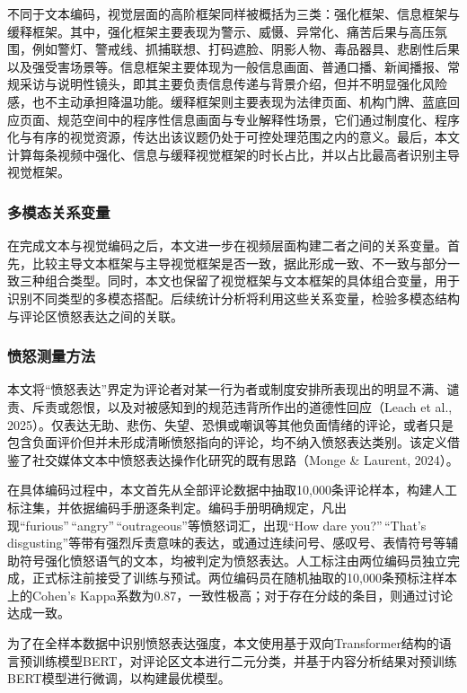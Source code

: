 \documentclass[
]{article}
\begin{document}
不同于文本编码，视觉层面的高阶框架同样被概括为三类：强化框架、信息框架与缓释框架。其中，强化框架主要表现为警示、威慑、异常化、痛苦后果与高压氛围，例如警灯、警戒线、抓捕联想、打码遮脸、阴影人物、毒品器具、悲剧性后果以及强受害场景等。信息框架主要体现为一般信息画面、普通口播、新闻播报、常规采访与说明性镜头，即其主要负责信息传递与背景介绍，但并不明显强化风险感，也不主动承担降温功能。缓释框架则主要表现为法律页面、机构门牌、蓝底回应页面、规范空间中的程序性信息画面与专业解释性场景，它们通过制度化、程序化与有序的视觉资源，传达出该议题仍处于可控处理范围之内的意义。最后，本文计算每条视频中强化、信息与缓释视觉框架的时长占比，并以占比最高者识别主导视觉框架。

\subsubsection{多模态关系变量}\label{ux591aux6a21ux6001ux5173ux7cfbux53d8ux91cf}

在完成文本与视觉编码之后，本文进一步在视频层面构建二者之间的关系变量。首先，比较主导文本框架与主导视觉框架是否一致，据此形成一致、不一致与部分一致三种组合类型。同时，本文也保留了视觉框架与文本框架的具体组合变量，用于识别不同类型的多模态搭配。后续统计分析将利用这些关系变量，检验多模态结构与评论区愤怒表达之间的关联。

\subsubsection{愤怒测量方法}\label{ux6124ux6012ux6d4bux91cfux65b9ux6cd5}

本文将``愤怒表达''界定为评论者对某一行为者或制度安排所表现出的明显不满、谴责、斥责或怨恨，以及对被感知到的规范违背所作出的道德性回应（Leach
et al.,
2025）。仅表达无助、悲伤、失望、恐惧或嘲讽等其他负面情绪的评论，或者只是包含负面评价但并未形成清晰愤怒指向的评论，均不纳入愤怒表达类别。该定义借鉴了社交媒体文本中愤怒表达操作化研究的既有思路（Monge
\& Laurent, 2024）。

在具体编码过程中，本文首先从全部评论数据中抽取10,000条评论样本，构建人工标注集，并依据编码手册逐条判定。编码手册明确规定，凡出现``furious''\,``angry''\,``outrageous''等愤怒词汇，出现``How
dare you?''\,``That's
disgusting''等带有强烈斥责意味的表达，或通过连续问号、感叹号、表情符号等辅助符号强化愤怒语气的文本，均被判定为愤怒表达。人工标注由两位编码员独立完成，正式标注前接受了训练与预试。两位编码员在随机抽取的10,000条预标注样本上的Cohen's
Kappa系数为0.87，一致性极高；对于存在分歧的条目，则通过讨论达成一致。

为了在全样本数据中识别愤怒表达强度，本文使用基于双向Transformer结构的语言预训练模型BERT，对评论区文本进行二元分类，并基于内容分析结果对预训练BERT模型进行微调，以构建最优模型。
\end{document}
